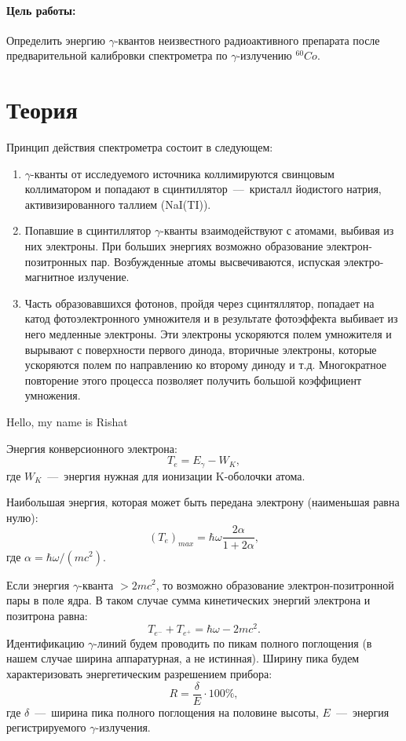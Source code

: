 \documentclass{physlab}
\begin{document}


\paragraph{Цель работы:} Определить энергию $\gamma$-квантов неизвестного радиоактивного препарата после предварительной калибровки спектрометра по $\gamma$-излучению $^{60}Co$.

\section{Теория}
Принцип действия спектрометра состоит в следующем:
\begin{enumerate}
    \item $\gamma$-кванты от исследуемого источника коллимируются свинцовым коллиматором и попадают в сцинтиллятор~---~кристалл йодистого натрия, активизированного таллием (NaI(TI)).
    \item Попавшие в сцинтиллятор $\gamma$-кванты взаимодействуют с атомами, выбивая из них электроны. При больших энергиях возможно образование электрон-позитронных пар. Возбужденные атомы высвечиваются, испуская электро-магнитное излучение.
    \item Часть образовавшихся фотонов, пройдя через сцинтяллятор, попадает на катод фотоэлектронного умножителя и в результате фотоэффекта выбивает из него медленные электроны. Эти электроны ускоряются полем умножителя и вырывают с поверхности первого динода, вторичные электроны, которые ускоряются полем по направлению ко второму диноду и т.д. Многократное повторение этого процесса позволяет получить большой коэффициент умножения.
\end{enumerate}  

Hello, my name is Rishat

Энергия конверсионного электрона:
\[ T_e = E_\gamma - W_K,\] 
где $W_K$~---~энергия нужная для ионизации K-оболочки атома.

Наибольшая энергия, которая может быть передана электрону (наименьшая равна нулю):
\[ (T_e)_{max} = \hbar \omega \dfrac{2 \alpha}{1 + 2 \alpha}, \] где $\alpha = \hbar \omega / (mc^2)$.

Если энергия $\gamma$-кванта $> 2mc^2$, то возможно образование электрон-позитронной пары в поле ядра. В таком случае сумма кинетических энергий электрона и позитрона равна:
\[ T_{e^-} + T_{e^+} = \hbar \omega - 2mc^2.\]
Идентификацию $\gamma$-линий будем проводить по пикам полного поглощения (в нашем случае ширина аппаратурная, а не истинная). Ширину пика будем характеризовать энергетическим разрешением прибора:
\[R = \dfrac{\delta}{E} \cdot 100 \% ,\] где $\delta$~---~ширина пика полного поглощения на половине высоты, $E$~---~энергия регистрируемого $\gamma$-излучения.
\end{document}

